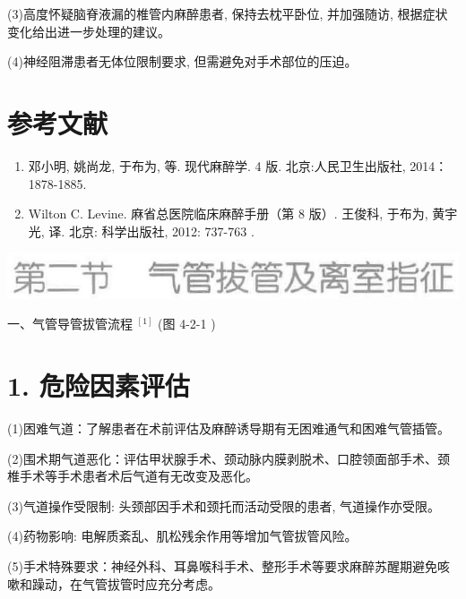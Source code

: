 \documentclass[10pt]{article}
\begin{document}
(3)高度怀疑脑脊液漏的椎管内麻醉患者, 保持去枕平卧位, 并加强随访, 根据症状变化给出进一步处理的建议。

(4)神经阻滞患者无体位限制要求, 但需避免对手术部位的压迫。

\section*{参考文献}
\begin{enumerate}
  \item 邓小明, 姚尚龙, 于布为, 等. 现代麻醉学. 4 版. 北京:人民卫生出版社, 2014：1878-1885.

  \item Wilton C. Levine. 麻省总医院临床麻醉手册（第 8 版）. 王俊科, 于布为, 黄宇光, 译. 北京: 科学出版社, 2012: 737-763 .

\end{enumerate}

\begin{center}
\includegraphics[max width=\textwidth]{2024_07_05_645bb794a4d4f32ee0c8g-263}
\end{center}

一、气管导管拔管流程 ${ }^{[1]}$ (图 4-2-1 )

\section*{1. 危险因素评估}
(1)困难气道：了解患者在术前评估及麻醉诱导期有无困难通气和困难气管插管。

(2)围术期气道恶化：评估甲状腺手术、颈动脉内膜剥脱术、口腔领面部手术、颈椎手术等手术患者术后气道有无改变及恶化。

(3)气道操作受限制: 头颈部因手术和颈托而活动受限的患者, 气道操作亦受限。

(4)药物影响: 电解质紊乱、肌松残余作用等增加气管拔管风险。

(5)手术特殊要求：神经外科、耳鼻喉科手术、整形手术等要求麻醉苏醒期避免咳嗽和躁动，在气管拔管时应充分考虑。
\end{document}
